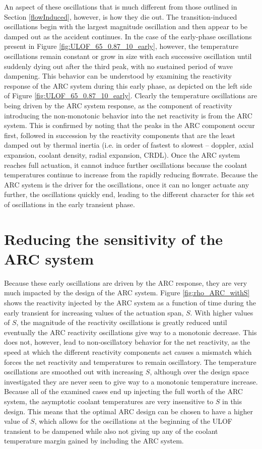 \documentclass[11pt, oneside]{article}   	%
\begin{document}
An aspect of these oscillations that is much different from those outlined in Section \ref{flowInduced}, however, is how they die out.
The transition-induced oscillations begin with the largest magnitude oscillation and then appear to be damped out as the accident continues. 
In the case of the early-phase oscillations present in Figure \ref{fig:ULOF_65_0.87_10_early}, however, the temperature oscillations remain constant or grow in size with each successive oscillation until suddenly dying out after the third peak, with no sustained period of wave dampening.
This behavior can be understood by examining the reactivity response of the ARC system during this early phase, as depicted on the left side of Figure \ref{fig:ULOF_65_0.87_10_early}.
Clearly the temperature oscillations are being driven by the ARC system response, as the component of reactivity introducing the non-monotonic behavior into the net reactivity is from the ARC system. 
This is confirmed by noting that the peaks in the ARC component occur first, followed in succession by the reactivity components that are the least damped out by thermal inertia (i.e. in order of fastest to slowest -- doppler, axial expansion, coolant density, radial expansion, CRDL).
Once the ARC system reaches full actuation, it cannot induce further oscillations because the coolant temperatures continue to increase from the rapidly reducing flowrate.
Because the ARC system is the driver for the oscillations, once it can no longer actuate any further, the oscillations quickly end, leading to the different character for this set of oscillations in the early transient phase. 

\section{Reducing the sensitivity of the ARC system} \label{sec:tau}

Because these early oscillations are driven by the ARC response, they are very much impacted by the design of the ARC system.
Figure \ref{fig:rho_ARC_withS} shows the reactivity injected by the ARC system as a function of time during the early transient for increasing values of the actuation span, $S$.
With higher values of $S$, the magnitude of the reactivity oscillations is greatly reduced until eventually the ARC reactivity oscillations give way to a monotonic decrease. 
This does not, however, lead to non-oscillatory behavior for the net reactivity, as the speed at which the different reactivity components act causes a mismatch which forces the net reactivity and temperatures to remain oscillatory.
The temperature oscillations are smoothed out with increasing $S$, although over the design space investigated they are never seen to give way to a monotonic temperature increase.
Because all of the examined cases end up injecting the full worth of the ARC system, the asymptotic coolant temperatures are very insensitive to $S$ in this design. 
This means that the optimal ARC design can be chosen to have a higher value of $S$, which allows for the oscillations at the beginning of the ULOF transient to be dampened while also not giving up any of the coolant temperature margin gained by including the ARC system.
\end{document}
